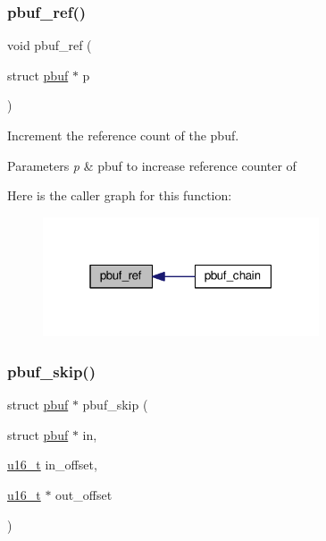 \subsubsection{\texorpdfstring{pbuf\+\_\+ref()}{pbuf\_ref()}}
{\footnotesize\ttfamily void pbuf\+\_\+ref (\begin{DoxyParamCaption}\item[{struct \hyperlink{structpbuf}{pbuf} $\ast$}]{p }\end{DoxyParamCaption})}

Increment the reference count of the pbuf.


\begin{DoxyParams}{Parameters}
{\em p} & pbuf to increase reference counter of \\
\hline
\end{DoxyParams}
Here is the caller graph for this function\+:
\nopagebreak
\begin{figure}[H]
\begin{center}
\leavevmode
\includegraphics[width=232pt]{group__pbuf_ga77f6bbd69e45e542014d9c547c7da74e_icgraph}
\end{center}
\end{figure}
\mbox{\label{group__pbuf_gabe4dfb2409c87a7c52c9a22a779f92e9}} 
\subsubsection{\texorpdfstring{pbuf\+\_\+skip()}{pbuf\_skip()}}
{\footnotesize\ttfamily struct \hyperlink{structpbuf}{pbuf} $\ast$ pbuf\+\_\+skip (\begin{DoxyParamCaption}\item[{struct \hyperlink{structpbuf}{pbuf} $\ast$}]{in,  }\item[{\hyperlink{group__compiler__abstraction_ga77570ac4fcab86864fa1916e55676da2}{u16\+\_\+t}}]{in\+\_\+offset,  }\item[{\hyperlink{group__compiler__abstraction_ga77570ac4fcab86864fa1916e55676da2}{u16\+\_\+t} $\ast$}]{out\+\_\+offset }\end{DoxyParamCaption})}

